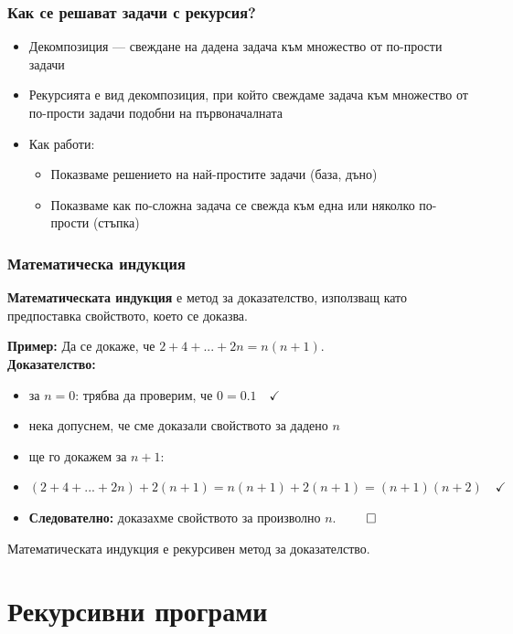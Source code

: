 \documentclass{beamer}
\begin{document}
\begin{frame}
  \frametitle{Как се решават задачи с рекурсия?}

  \begin{itemize}[<+->]
  \item \alert{Декомпозиция} --- свеждане на дадена задача към множество от по-прости задачи
  \item Рекурсията е вид декомпозиция, при който свеждаме задача към множество от по-прости задачи \alert{подобни на първоначалната}
  \item Как работи:
    \begin{itemize}
    \item Показваме решението на най-простите задачи \alert{(база, дъно)}
    \item Показваме как по-сложна задача се свежда към една или няколко по-прости \alert{(стъпка)}
    \end{itemize}
  \end{itemize}
\end{frame}

\begin{frame}
  \frametitle{Математическа индукция}

  \begin{definition}
    \textbf{Математическата индукция} е метод за доказателство, използващ като предпоставка свойството, което се доказва.
  \end{definition}
  \pause
  \textbf{Пример:} Да се докаже, че $2 + 4 + ... + 2n = n(n+1)$.\\[1em]
  \pause
  \textbf{Доказателство:}
  \begin{itemize}[<+->]
  \item за $n = 0$: трябва да проверим, че $0 = 0.1\quad\checkmark$
  \item нека допуснем, че сме доказали свойството за дадено $n$
  \item ще го докажем за $n+1$:
  \item $(2 + 4 + ... + 2n) + 2(n+1) = n(n+1) + 2(n+1) = (n+1)(n+2)\quad\checkmark$
  \item \textbf{Следователно:} доказахме свойството за произволно $n$. $\qed$
  \end{itemize}
  \onslide<+->
  Математическата индукция е рекурсивен метод за доказателство.
\end{frame}

\section{Рекурсивни програми}
\end{document}

